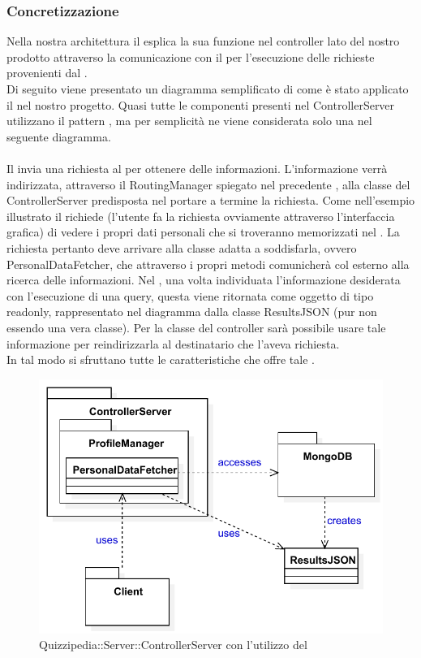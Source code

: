 \documentclass[a4paper, titlepage]{article}
\begin{document}
\subsubsection{Concretizzazione}
Nella nostra architettura il  esplica la sua funzione nel controller lato  del nostro prodotto attraverso la comunicazione con il   per l'esecuzione delle richieste provenienti dal .
\\ Di seguito viene presentato un diagramma semplificato di come è stato applicato il  nel nostro progetto. Quasi tutte le componenti presenti nel ControllerServer utilizzano il pattern , ma per semplicità ne viene considerata solo una nel seguente diagramma.
\\
\\ Il  invia una richiesta al  per ottenere delle informazioni. L'informazione verrà indirizzata, attraverso il RoutingManager spiegato nel precedente , alla classe del ControllerServer predisposta nel portare a termine la richiesta. 
Come nell'esempio illustrato il  richiede (l'utente fa la richiesta ovviamente attraverso l'interfaccia grafica) di vedere i propri dati personali che si troveranno memorizzati nel . La richiesta pertanto deve arrivare alla classe adatta a soddisfarla, ovvero PersonalDataFetcher, che attraverso i propri metodi comunicherà col  esterno alla ricerca delle informazioni.
Nel  , una volta individuata l'informazione desiderata con l'esecuzione di una query, questa viene ritornata come oggetto  di tipo readonly, rappresentato nel diagramma dalla classe ResultsJSON (pur non essendo una vera classe). Per la classe del controller sarà possibile usare tale informazione per reindirizzarla al destinatario che l'aveva richiesta.
\\ In tal modo si sfruttano tutte le caratteristiche che offre tale .

\begin{figure}[htp]
\centering
\includegraphics[scale=0.75]{Img/DAO.pdf}
\caption{Quizzipedia::Server::ControllerServer con l'utilizzo del }
\label{}
\end{figure}
\end{document}
